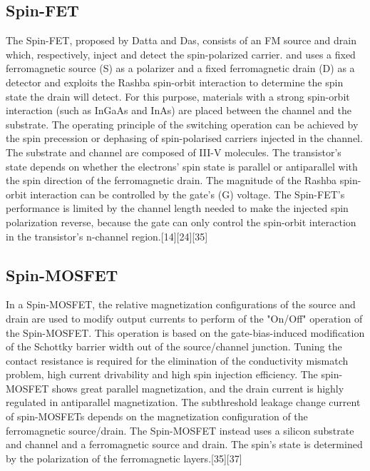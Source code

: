 \documentclass{article}
\begin{document}
\subsection{Spin-FET}
The Spin-FET, proposed by Datta and Das, consists of an FM source and drain which, respectively, inject and detect the spin-polarized carrier. and uses a fixed ferromagnetic source (S) as a polarizer and a fixed ferromagnetic drain (D) as a detector and exploits the Rashba spin-orbit interaction to determine the spin state the drain will detect. For this purpose, materials with a strong spin-orbit interaction (such as InGaAs and InAs) are placed between the channel and the substrate. The operating principle of the switching operation can be achieved by the spin precession or dephasing of spin-polarised carriers injected in the channel. The substrate and channel are composed of III-V molecules.
The transistor's state depends on whether the electrons' spin state is parallel or antiparallel with the spin direction of the ferromagnetic drain. The magnitude of the Rashba spin-orbit interaction can be controlled by the gate’s (G) voltage. The Spin-FET's performance is limited by the channel length needed to make the injected spin polarization reverse, because the gate can only control the spin-orbit interaction in the transistor's n-channel region.[14][24][35]

\subsection{Spin-MOSFET}

In a Spin-MOSFET, the relative magnetization configurations of the source and drain are used to modify output currents to perform of the "On/Off" operation of the Spin-MOSFET. This operation is based on the gate-bias-induced modification of the Schottky barrier width out of the source/channel junction. Tuning the contact resistance is required for the elimination of the conductivity mismatch problem, high current drivability and high spin injection efficiency. The spin-MOSFET shows great parallel magnetization, and the drain current is highly regulated in antiparallel magnetization. The subthreshold leakage change current of spin-MOSFETs depends on the magnetization configuration of the ferromagnetic source/drain.  The Spin-MOSFET instead uses a silicon substrate and channel and a ferromagnetic source and drain. The spin’s state is determined by the polarization of the ferromagnetic layers.[35][37]
\end{document}
